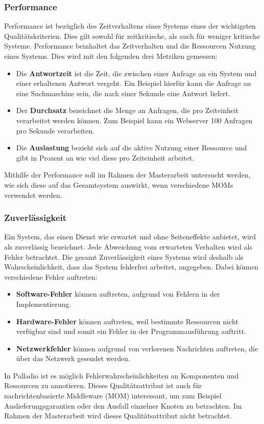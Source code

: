 \subsubsection{Performance} 
Performance ist bezüglich des Zeitverhaltens eines Systems eines der wichtigsten Qualitätskriterien. Dies gilt sowohl für zeitkritische, als auch für weniger kritische Systeme. Performance beinhaltet das Zeitverhalten und die Ressourcen Nutzung eines Systems. Dies wird mit den folgenden drei Metriken gemessen:
\begin{itemize}
\item Die \textbf{Antwortzeit} ist die Zeit, die zwischen einer Anfrage an ein System und einer erhaltenen Antwort vergeht. Ein Beispiel hierfür kann die Anfrage an eine Suchmaschine sein, die nach einer Sekunde eine Antwort liefert.
\item Der \textbf{Durchsatz} bezeichnet die Menge an Anfragen, die pro Zeiteinheit verarbeitet werden können. Zum Beispiel kann ein Webserver 100 Anfragen pro Sekunde verarbeiten.
\item Die \textbf{Auslastung} bezieht sich auf die aktive Nutzung einer Ressource und gibt in Prozent an wie viel diese pro Zeiteinheit arbeitet. 
\end{itemize}
Mithilfe der Performance soll im Rahmen der Masterarbeit untersucht werden, wie sich diese auf das Gesamtsystem auswirkt, wenn verschiedene MOMs verwendet werden.

\subsubsection{Zuverlässigkeit}
Ein System, das einen Dienst wie erwartet und ohne Seiteneffekte anbietet, wird als zuverlässig bezeichnet. Jede Abweichung vom erwarteten Verhalten wird als Fehler betrachtet. Die gesamt Zuverlässigkeit eines Systems wird deshalb als Wahrscheinlichkeit, dass das System fehlerfrei arbeitet, angegeben. Dabei können verschiedene Fehler auftreten:
\begin{itemize}
\item \textbf{Software-Fehler} können auftreten, aufgrund von Fehlern in der Implementierung.
\item \textbf{Hardware-Fehler} können auftreten, weil bestimmte Ressourcen nicht verfügbar sind und somit ein Fehler in der Programmausführung auftritt.
\item \textbf{Netzwerkfehler} können aufgrund von verlorenen Nachrichten auftreten, die über das Netzwerk gesendet werden.
\end{itemize}
In Palladio ist es möglich Fehlerwahrscheinlichkeiten an Komponenten und Ressourcen zu annotieren. Dieses Qualitätsattribut ist auch für nachrichtenbasierte Middleware (MOM) interessant, um zum Beispiel Auslieferungsgarantien oder den Ausfall einzelner Knoten zu betrachten. Im Rahmen der Masterarbeit wird dieses Qualitätsattribut nicht betrachtet.

